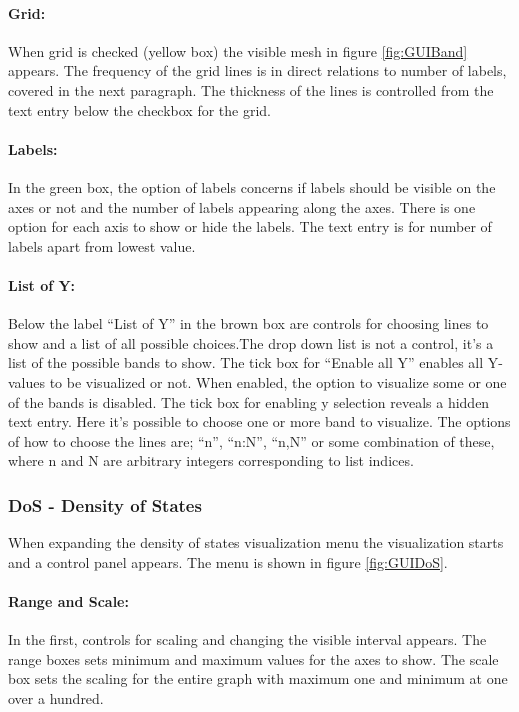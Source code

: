 \paragraph{Grid: }
When grid is checked (yellow box) the visible mesh in figure \ref{fig:GUIBand} appears. The frequency of the grid lines is in direct relations to number of labels, covered in the next paragraph. The thickness of the lines is controlled from the text entry below the checkbox for the grid.
\paragraph{Labels: }
In the green box, the option of labels concerns if labels should be visible on the axes or not and the number of labels appearing along the axes. There is one option for each axis to show or hide the labels. The text entry is for number of labels apart from lowest value.
\paragraph{List of Y: }
Below the label ``List of Y'' in the brown box are controls for choosing lines to show and a list of all possible choices.The drop down list is not a control, it's a list of the possible bands to show. The tick box for ``Enable all Y'' enables all Y-values to be visualized or not. When enabled, the option to visualize some or one of the bands is disabled. 
The tick box for enabling y selection reveals a hidden text entry. Here it's possible to choose one or more band to visualize. The options of how to choose the lines are; ``n'', ``n:N'', ``n,N'' or some combination of these, where n and N are arbitrary integers corresponding to list indices. 

\subsubsection{DoS - Density of States}
When expanding the density of states visualization menu the visualization starts and a control panel appears. The menu is shown in figure \ref{fig:GUIDoS}.


\paragraph{Range and Scale: }
In the first, controls for scaling and changing the visible interval appears. The range boxes sets minimum and maximum values for the axes to show. The scale box sets the scaling for the entire graph with maximum one and minimum at one over a hundred.
